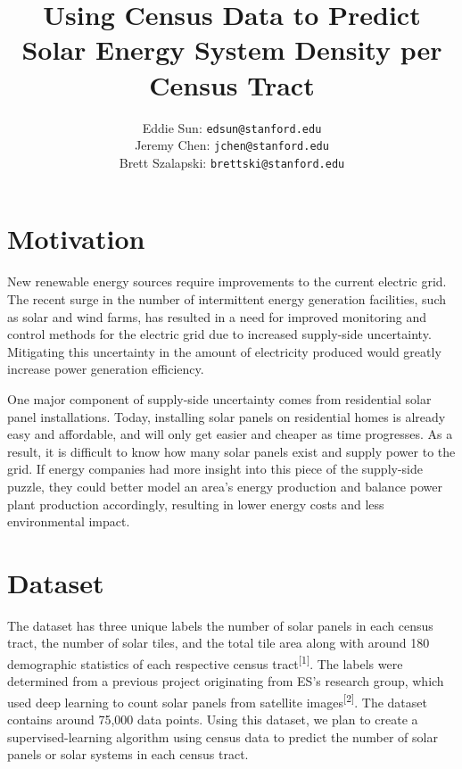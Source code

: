 \documentclass{article}
\title{Using Census Data to Predict Solar Energy System Density per Census Tract}
\author{ Eddie Sun: \texttt{edsun@stanford.edu}\\
  Jeremy Chen: \texttt{jchen@stanford.edu}\\
  Brett Szalapski: \texttt{brettski@stanford.edu}\\
}
\begin{document}
	
	\maketitle


	\section{Motivation}
	
	New renewable energy sources require improvements to the current electric grid. The recent surge in the number of intermittent energy generation facilities, such as solar and wind farms, has resulted in a need for improved monitoring and control methods for the electric grid due to increased supply-side uncertainty. Mitigating this uncertainty in the amount of electricity produced would greatly increase power generation efficiency.
	
	One major component of supply-side uncertainty comes from residential solar panel installations. Today, installing solar panels on residential homes is already easy and affordable, and will only get easier and cheaper as time progresses. As a result, it is difficult to know how many solar panels exist and supply power to the grid. If energy companies had more insight into this piece of the supply-side puzzle, they could better model an area’s energy production and balance power plant production accordingly, resulting in lower energy costs and less environmental impact.
	
	
	
	\section{Dataset}
	\label{dataset}
	
	The dataset has three unique labels \textemdash the number of solar panels in each census tract, the number of solar tiles, and the total tile area \textemdash along with around 180 demographic statistics of each respective census tract\textsuperscript{[1]}. The labels were determined from a previous project originating from ES’s research group, which used deep learning to count solar panels from satellite images\textsuperscript{[2]}. The dataset contains around 75,000 data points. Using this dataset, we plan to create a supervised-learning algorithm using census data to predict the number of solar panels or solar systems in each census tract.
	
\end{document}
